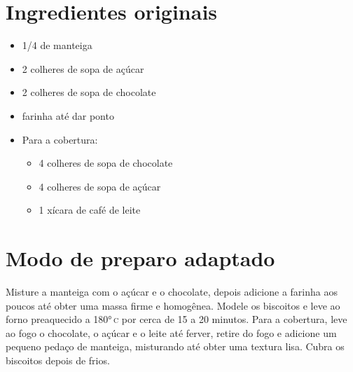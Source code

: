 \section{Ingredientes originais}

\begin{itemize}
\item 1/4 de manteiga
\item 2 colheres de sopa de açúcar
\item 2 colheres de sopa de chocolate
\item farinha até dar ponto
\item Para a cobertura:
	\begin{itemize}
	\item 4 colheres de sopa de chocolate
	\item 4 colheres de sopa de açúcar
	\item 1 xícara de café de leite
\end{itemize}
\end{itemize}

\section{Modo de preparo adaptado}

Misture a manteiga com o açúcar e o chocolate, depois adicione a farinha aos poucos até obter uma massa firme e homogênea. Modele os biscoitos e leve ao forno preaquecido a 180°\,\textsc{c} por cerca de 15 a 20 minutos. Para a cobertura, leve ao fogo o chocolate, o açúcar e o leite até ferver, retire do fogo e adicione um pequeno pedaço de manteiga, misturando até obter uma textura lisa. Cubra os biscoitos depois de frios.